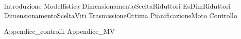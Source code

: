 \documentclass{miaclasse}
\begin{document}
\primapag

\pagestyle{fancy}







{Introduzione}
{Modellistica}
{DimensionamentoSceltaRiduttori}
{EsDimRiduttori}
{DimensionamentoSceltaViti}
{TrasmissioneOttima}
{PianificazioneMoto}
{Controllo}

\appendix
{Appendice_controlli}
{Appendice_MV}
\end{document}
